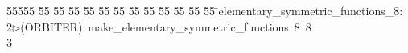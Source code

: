 %
%
\begin{tabbing}
55555 \= 55 \= 55 \= 55 \= 55 \= 55 \= 55 \= 55 \= 55 \= 55 \= 55 \= 55 \= 55 \= \>elementary\_symmetric\_functions\_8:\\[0pt]
2\>$\triangleright$\>(ORBITER)\ make\_elementary\_symmetric\_functions\ 8\ 8\\[0pt]
3\>\end{tabbing}
